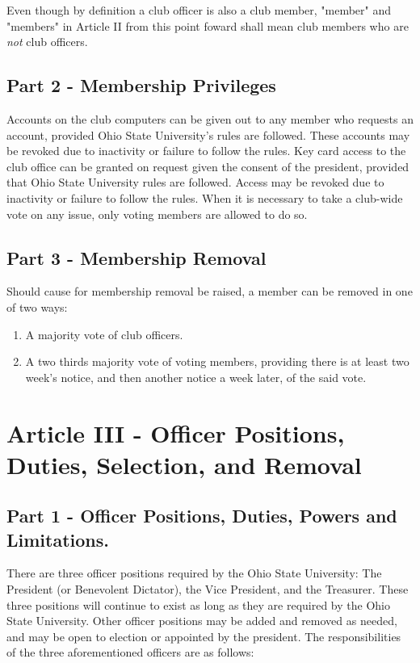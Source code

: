 \documentclass{article}
\begin{document}
	Even though by definition a club officer is also a club member, "member" and "members" in Article II from this point foward shall mean club members who are \textit{not} club officers.

	\subsection{Part 2 - Membership Privileges}

	Accounts on the club computers can be given out to any member who requests an account, provided Ohio State University's rules are followed.  These accounts may be revoked due to inactivity or failure to follow the rules.  Key card access to the club office can be granted on request given the consent of the president, provided that Ohio State University rules are followed.  Access may be revoked due to inactivity or failure to follow the rules.
	When it is necessary to take a club-wide vote on any issue, only voting members are allowed to do so.

	\subsection{Part 3 - Membership Removal}

	Should cause for membership removal be raised, a member can be removed in one of two ways:
	\begin{enumerate}
		\item A majority vote of club officers.
		\item A two thirds majority vote of voting members, providing there is at least two week's notice, and then another notice a week later, of the said vote.
	\end{enumerate}

	\section{Article III - Officer Positions, Duties, Selection, and Removal}

	\subsection{Part 1 - Officer Positions, Duties, Powers and Limitations.}

	There are three officer positions required by the Ohio State University: The President (or Benevolent Dictator), the Vice President, and the Treasurer.  These three positions will continue to exist as long as they are required by the Ohio State University. Other officer positions may be added and removed as needed, and may be open to election or appointed by the president. The responsibilities of the three aforementioned officers are as follows:\\
\end{document}

